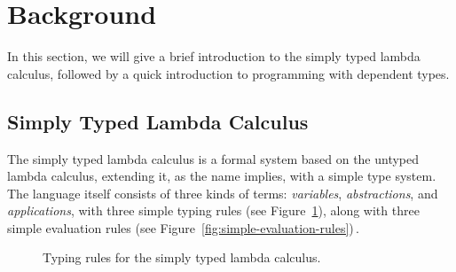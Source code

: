 \section{Background}
\label{sec:background}
In this section, we will give a brief introduction to the simply typed lambda calculus, followed by a quick introduction to programming with dependent types.

\subsection{Simply Typed Lambda Calculus}
\label{sec:stlc}
The simply typed lambda calculus is a formal system based on the untyped lambda calculus, extending it, as the name implies, with a simple type system. The language itself consists of three kinds of terms: \emph{variables}, \emph{abstractions}, and \emph{applications}, with three simple typing rules (see Figure~\ref{fig:simple-typing-rules}), along with three simple evaluation rules (see Figure~\ref{fig:simple-evaluation-rules})\,\cite[pp. 99]{Pierce:TypeSystems}.

\begin{center}
\begin{figure}

\begin{prooftree}
\end{prooftree}

\begin{prooftree}
\end{prooftree}

\begin{prooftree}
\end{prooftree}

\caption{Typing rules for the simply typed lambda calculus.}
\label{fig:simple-typing-rules}

\end{figure}
\end{center}

